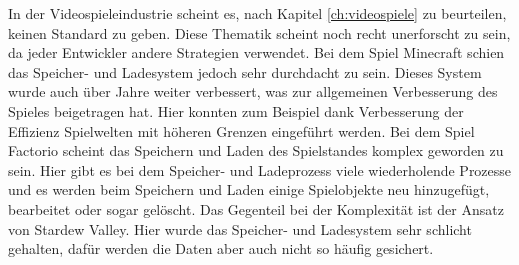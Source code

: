 In der Videospieleindustrie scheint es, nach Kapitel \ref{ch:videospiele} zu beurteilen, keinen Standard zu geben. Diese Thematik scheint noch recht unerforscht zu sein, da jeder Entwickler andere Strategien verwendet. Bei dem Spiel Minecraft schien das Speicher- und Ladesystem jedoch sehr durchdacht zu sein. Dieses System wurde auch über Jahre weiter verbessert, was zur allgemeinen Verbesserung des Spieles beigetragen hat. Hier konnten zum Beispiel dank Verbesserung der Effizienz Spielwelten mit höheren Grenzen eingeführt werden. Bei dem Spiel Factorio scheint das Speichern und Laden des Spielstandes komplex geworden zu sein. Hier gibt es bei dem Speicher- und Ladeprozess viele wiederholende Prozesse und es werden beim Speichern und Laden einige Spielobjekte neu hinzugefügt, bearbeitet oder sogar gelöscht. Das Gegenteil bei der Komplexität ist der Ansatz von Stardew Valley. Hier wurde das Speicher- und Ladesystem sehr schlicht gehalten, dafür werden die Daten aber auch nicht so häufig gesichert. 